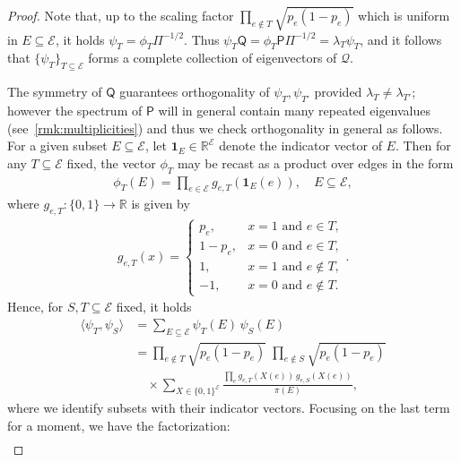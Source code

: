 \documentclass[10pt,a4paper]{amsart}
\begin{document}
\begin{proof}
    Note that, up to the scaling factor $\prod_{e\notin T} \sqrt{p_e(1-p_e)}$ which is uniform in $E\subseteq{\mathcal E}$, it holds $\psi_T = \phi_T \Pi^{-1/2}$. Thus $\psi_T \mathsf{Q}= \phi_T\mathsf{P}\Pi^{-1/2} = \lambda_T \psi_T$, and it follows that $\{\psi_T\}_{T\subseteq \mathcal{E}}$ forms a complete collection of eigenvectors of $\mathcal{Q}$. 

    The symmetry of $\mathsf{Q}$ guarantees orthogonality of $\psi_T, \psi_{T'}$ provided $\lambda_T\neq\lambda_{T'}$; however the spectrum of $\mathsf{P}$ will in general contain many repeated eigenvalues (see~\cref{rmk:multiplicities}) and thus we check orthogonality in general as follows. For a given subset $E\subseteq\mathcal{E}$, let $\mathbf{1}_E\in\mathbb{R}^{\mathcal{E}}$ denote the indicator vector of $E$. Then for any $T\subseteq\mathcal{E}$ fixed, the vector $\phi_T$ may be recast as a product over edges in the form
        \begin{align*}
            \phi_T(E)=\prod_{e\in\mathcal E}g_{e,T}(\mathbf{1}_E(e)),\quad E\subseteq\mathcal{E},
        \end{align*}
    where $g_{e,T}:\{0, 1\}\rightarrow\mathbb{R}$ is given by
        \begin{align*}
            g_{e,T}(x)=
            \begin{cases}
            p_e,&x=1\text{ and }e\in T,\\
            1-p_e,&x=0\text{ and }e\in T,\\
            1,&x=1\text{ and }e\notin T,\\
            -1,&x=0\text{ and }e\notin T.
            \end{cases}.
        \end{align*}
    Hence, for $S, T\subseteq\mathcal{E}$ fixed, it holds
        \begin{align*}
            \langle\psi_T,\psi_S\rangle
            &=\sum_{E\subseteq\mathcal E}\psi_T(E)\,\psi_S(E)\\
            &=\prod_{e\notin T}\sqrt{p_e(1-p_e)}
            \;\prod_{e\notin S}\sqrt{p_e(1-p_e)}\\
            &\quad\times \sum_{X\in\{0,1\}^{\mathcal E}}
            \frac{\prod_{e}g_{e,T}(X(e))\,g_{e,S}(X(e))}{\pi(E)},
        \end{align*}
    where we identify subsets with their indicator vectors. Focusing on the last term for a moment, we have the factorization:
        \begin{align*}

\end{align*}
\end{proof}
\end{document}
